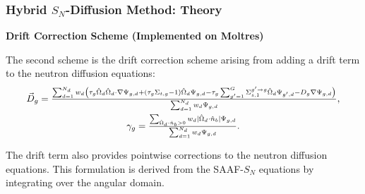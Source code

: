 \begin{frame}
  \frametitle{Hybrid $S_N$-Diffusion Method: Theory}
  \textbf{Drift Correction Scheme (Implemented on Moltres)}
  \vspace{.2cm}

  The second scheme is the drift correction scheme arising from adding a drift term to the neutron
  diffusion equations:
  \begin{gather}
  \scalebox{0.95}{$
    \vec{D}_g = \frac{\sum^{N_d}_{d=1}w_d\left(\tau_g\hat{\Omega}_d\hat{\Omega}_d\cdot\nabla\Psi_{g,d}
    + \left(\tau_g\Sigma_{t,g}-1\right)\hat{\Omega}_d\Psi_{g,d}
    - \tau_g\sum^G_{g'=1}\Sigma^{g'\rightarrow g}_{s,1}\hat{\Omega}_d\Psi_{g',d}
- D_g\nabla\Psi_{g,d}\right)}{\sum^{N_d}_{d=1}w_d\Psi_{g,d}},$} \label{eq:drift} \\
  \scalebox{0.95}{$
    \gamma_g =
    \frac{\sum_{\hat{\Omega}_d\cdot\hat{n}_b > 0}w_d |\hat{\Omega}_d\cdot\hat{n}_b |
  \Psi_{g,d}}{\sum^{N_d}_{d=1}w_d\Psi_{g,d}}.$} \label{eq:bound-coef}
  \end{gather}
  \vspace{.2cm}

  The drift term also provides pointwise corrections to the neutron diffusion equations. This
  formulation is derived from the SAAF-$S_N$ equations by integrating over the angular domain.
\end{frame}

